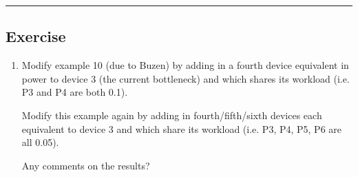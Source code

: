 \documentclass[12pt,fleqn]{report}
\begin{document}
\noindent
\hfill{\rule{160mm}{0.5mm}}


\subsection*{Exercise}


\begin{enumerate}

\item Modify example 10 (due to Buzen)  by 
adding in a fourth device equivalent in power to device 3 
(the current bottleneck) 
and which shares its workload (i.e. P3  and P4 are both 0.1).

Modify this example again by 
adding in fourth/fifth/sixth devices
each equivalent to device 3 and which share its workload 
(i.e. P3, P4, P5, P6 are all 0.05).

Any comments on the results?


\end{enumerate}
\end{document}
